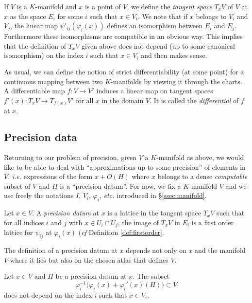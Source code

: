 \documentclass{lms}
\begin{document}
If $V$ is a $K$-manifold and $x$ is a point of $V$, we define the 
\emph{tangent space} $T_x V$ of $V$ at $x$ as the space $E_i$ for some 
$i$ such that $x \in V_i$. We note that if $x$ belongs to $V_i$ and 
$V_j$, the linear map $\psi'_{ij}(\varphi_i(x))$ defines an isomorphism 
between $E_i$ and $E_j$. Furthermore these isomorphisms are compatible 
in an obvious way. This implies that the definition of $T_x V$ given 
above does not depend (up to some canonical isomorphism) on the index 
$i$ such that $x \in V_i$ and then makes sense.

As usual, we can define the notion of strict differentiability (at some 
point) for a continuous mapping between two $K$-manifolds by viewing it 
through the charts. A  differentiable map $f : V \to V'$ induces 
a linear map on tangent spaces $f'(x) : T_x V \to T_{f(x)} V'$ for all 
$x$ in the domain $V$. It is called the \emph{differential} of $f$ at
$x$.

\subsection{Precision data}

Returning to our problem of precision, given $V$ a $K$-manifold as 
above, we would like to be able to deal with ``approximations up to some 
precision'' of elements in $V$, \emph{i.e.} expressions of the form $x + 
O(H)$ where $x$ belongs to a dense \emph{computable} subset of $V$ and 
$H$ is a ``precision datum''.
For now, we fix a $K$-manifold $V$ and we use freely the notations $I$, 
$V_i$, $\varphi_i$, \emph{etc.} introduced in \S \ref{ssec:manifold}.

\begin{deftn}
Let $x \in V$.
A \emph{precision datum} at $x$ is a lattice in the tangent space 
$T_x V$ such that for all indices $i$ and $j$ with $x \in U_i \cap
U_j$, the image of $T_x V$ in $E_i$ is a first order lattice for
$\psi_{ij}$ at $\varphi_i(x)$ (\emph{cf} Definition \ref{def:firstorder}.
\end{deftn}

\begin{rmk}
The definition of a precision datum at $x$ depends not only on $x$
and the manifold $V$ where it lies but also on the chosen atlas that
defines $V$.
\end{rmk}

\begin{prop}
\label{prop:independence}
Let $x \in V$ and $H$ be a precision datum at $x$.
The subset
$$\varphi_i^{-1}\big(\varphi_i(x) + \varphi_i'(x)(H)\big) 
\subset V$$
does not depend on the index $i$ such that $x \in V_i$.
\end{prop}
\end{document}
